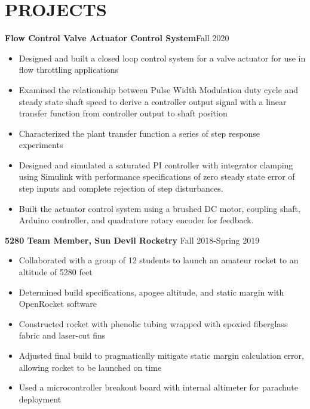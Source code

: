 \documentclass{article}
\begin{document}
\section{PROJECTS}
\textbf{Flow Control Valve Actuator Control System}\hfill Fall 2020
\vspace{0.5em}
\begin{itemize}
	\item Designed and built a closed loop control system for a valve actuator for use in flow throttling applications
	\item Examined the relationship between Pulse Width Modulation duty cycle and steady state shaft speed to derive a controller output signal with a linear transfer function from controller output to shaft position  
	\item Characterized the plant transfer function a series of step response experiments
	\item  Designed and simulated a saturated PI controller with integrator clamping using Simulink with performance specifications of zero steady state error of step inputs and complete rejection of step disturbances.
	\item  Built the actuator control system using a brushed DC motor, coupling shaft, Arduino controller, and quadrature rotary encoder for feedback.
\end{itemize}
\vspace{0.5em}
\textbf{5280 Team Member, Sun Devil Rocketry}
\hfill Fall 2018-Spring 2019
\vspace{0.5em}
\begin{itemize}
	\item Collaborated with a group of 12 students to launch an amateur rocket to an altitude of 5280 feet
	\item Determined build specifications, apogee altitude, and static margin with OpenRocket software
	\item Constructed rocket with phenolic tubing wrapped with epoxied fiberglass fabric and laser-cut fins 
	\item Adjusted final build to pragmatically mitigate static margin calculation error, allowing rocket to be launched on time
	\item Used a microcontroller breakout board with internal altimeter for parachute deployment
\end{itemize}
\thispagestyle{empty}
\end{document}
